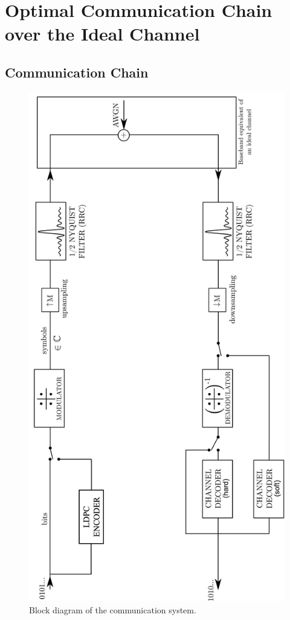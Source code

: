 \section{Optimal Communication Chain over the Ideal Channel}
\subsection{Communication Chain}
\begin{figure}[H]
	\centering
	\includegraphics[angle=-90, width=0.9\linewidth]{Images/com-chain} %
	\caption{Block diagram of the communication system.}
	\label{fig:com-chain}
\end{figure}
